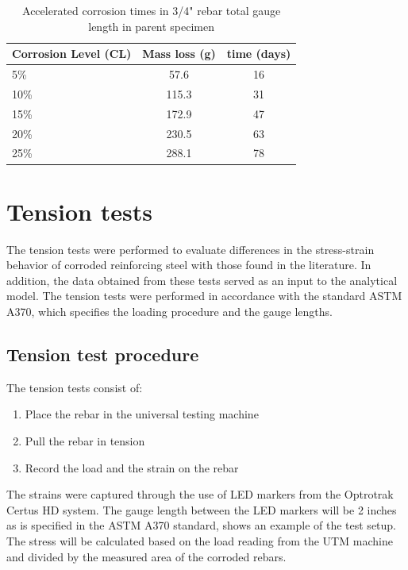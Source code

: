\begin{table}[htbp]
	\caption{Accelerated corrosion times in 3/4" rebar total gauge length in parent specimen}
	\label{tab:AcceleratedCorrosionTime}
	\centering	
		\begin{tabular}{l c c}
		Corrosion Level (CL) & Mass loss (g)   & time (days)     \\  \hline	
		5\%                  & 57.6            & 16    \\	
		10\%                 & 115.3            & 31     \\	
		15\%                 & 172.9            & 47   \\	
		20\%                 & 230.5            & 63     \\
		25\%                 & 288.1               & 78   \\
		\end{tabular}
\end{table}

\section{Tension tests}

The tension tests were performed to evaluate differences in the stress-strain behavior of corroded reinforcing steel with those found in the literature. In addition, the data obtained from these tests served as an input to the analytical model. The tension tests were performed in accordance with the standard ASTM A370, which specifies the loading procedure and the gauge lengths. 
\subsection{Tension test procedure}

The tension tests consist of:
\begin{enumerate}
    \item Place the rebar in the universal testing machine
    \item Pull the rebar in tension 
    \item Record the load and the strain on the rebar 
\end{enumerate}

The strains were captured through the use of LED markers from the Optrotrak Certus HD system. The gauge length between the LED markers will be 2 inches as is specified in the ASTM A370 standard,  shows an example of the test setup. The stress will be calculated based on the load reading from the UTM machine and divided by the measured area of the corroded rebars.


